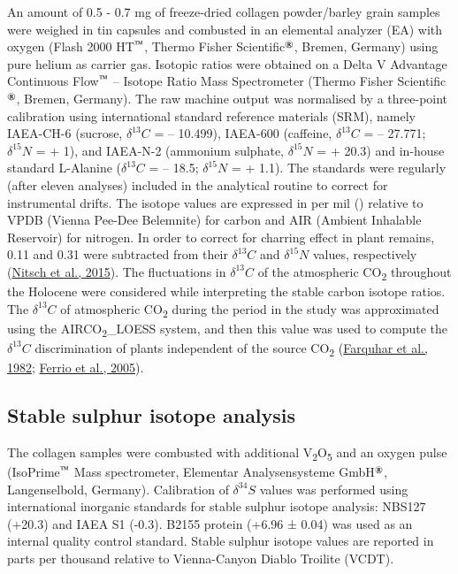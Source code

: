 \documentclass[preprint, 3p, authoryear]{elsarticle} %
\begin{document}
An amount of 0.5 - 0.7 mg of freeze-dried collagen powder/barley grain samples were weighed in tin capsules and combusted in an elemental analyzer (EA) with oxygen (Flash 2000 HT\(^\text{\texttrademark}\), Thermo Fisher Scientific\(^\text{\textregistered}\), Bremen, Germany) using pure helium as carrier gas. Isotopic ratios were obtained on a Delta V Advantage Continuous Flow\(^\text{\texttrademark}\) -- Isotope Ratio Mass Spectrometer (Thermo Fisher Scientific\(^\text{\textregistered}\), Bremen, Germany). The raw machine output was normalised by a three-point calibration using international standard reference materials (SRM), namely IAEA-CH-6 (sucrose, \(\delta ^{13}C\) = -- 10.499\text{\textperthousand}), IAEA-600 (caffeine, \(\delta ^{13}C\) = -- 27.771\text{\textperthousand}; \(\delta ^{15}N\) = + 1\text{\textperthousand}), and IAEA-N-2 (ammonium sulphate, \(\delta ^{15}N\) = + 20.3\text{\textperthousand}) and in-house standard L-Alanine (\(\delta ^{13}C\) = -- 18.5\text{\textperthousand}; \(\delta ^{15}N\) = + 1.1\text{\textperthousand}). The standards were regularly (after eleven analyses) included in the analytical routine to correct for instrumental drifts. The isotope values are expressed in per mil (\text{\textperthousand}) relative to VPDB (Vienna Pee-Dee Belemnite) for carbon and AIR (Ambient Inhalable Reservoir) for nitrogen. In order to correct for charring effect in plant remains, 0.11\text{\textperthousand} and 0.31\text{\textperthousand} were subtracted from their \(\delta ^{13}C\) and \(\delta ^{15}N\) values, respectively (\protect\hyperlink{ref-nitsch_etal15}{Nitsch et al., 2015}). The fluctuations in \(\delta ^{13}C\) of the atmospheric CO\textsubscript{2} throughout the Holocene were considered while interpreting the stable carbon isotope ratios. The \(\delta ^{13}C\) of atmospheric CO\textsubscript{2} during the period in the study was approximated using the AIRCO\textsubscript{2}\_LOESS system, and then this value was used to compute the \(\delta ^{13}C\) discrimination of plants independent of the source CO\textsubscript{2} (\protect\hyperlink{ref-farquhar_etal82}{Farquhar et al., 1982}; \protect\hyperlink{ref-ferrio_etal05}{Ferrio et al., 2005}).

\hypertarget{stable-sulphur-isotope-analysis}{%
\subsection{Stable sulphur isotope analysis}\label{stable-sulphur-isotope-analysis}}

The collagen samples were combusted with additional V\textsubscript{2}O\textsubscript{5} and an oxygen pulse (IsoPrime\(^\text{\texttrademark}\) Mass spectrometer, Elementar Analysensysteme GmbH\(^\text{\textregistered}\), Langenselbold, Germany). Calibration of \(\delta ^{34}S\) values was performed using international inorganic standards for stable sulphur isotope analysis: NBS127 (+20.3\text{\textperthousand}) and IAEA S1 (-0.3\text{\textperthousand}). B2155 protein (+6.96 ± 0.04\text{\textperthousand}) was used as an internal quality control standard. Stable sulphur isotope values are reported in parts per thousand relative to Vienna-Canyon Diablo Troilite (VCDT).
\end{document}
